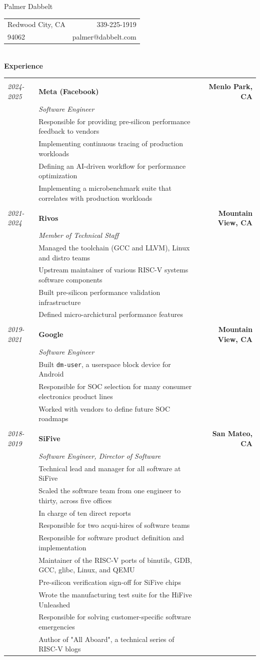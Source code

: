 \documentclass{letter}
\newcommand{\experience}[4]{&& \\
\textit{#1} \hspace{0.2in} & \textbf{#2} & \textbf{#3} \\
& \textit{#4} & \\}
\newcommand{\subexperience}[1]{& #1 & \\}
\begin{document}
\thispagestyle{empty}

\LARGE
\begin{center}Palmer Dabbelt\end{center}
\normalsize

\begin{tabular*}{\textwidth}{@{\extracolsep{\fill}} l r}
  Redwood City, CA& 339-225-1919 \\
  94062 & palmer@dabbelt.com \\
  \hline
\end{tabular*}\\

\textbf{Experience}\\
\begin{tabular*}{\textwidth}{l l @{\extracolsep{\fill}} r}
  \experience{2024-2025}{Meta (Facebook)}{Menlo Park, CA}{Software Engineer}
  \subexperience{Responsible for providing pre-silicon performance feedback to vendors}
  \subexperience{Implementing continuous tracing of production workloads}
  \subexperience{Defining an AI-driven workflow for performance optimization}
  \subexperience{Implementing a microbenchmark suite that correlates with production workloads}

  \experience{2021-2024}{Rivos}{Mountain View, CA}{Member of Technical Staff}
  \subexperience{Managed the toolchain (GCC and LLVM), Linux and distro teams}
  \subexperience{Upstream maintainer of various RISC-V systems software components}
  \subexperience{Built pre-silicon performance validation infrastructure}
  \subexperience{Defined micro-archictural performance features}

  \experience{2019-2021}{Google}{Mountain View, CA}{Software Engineer}
  \subexperience{Built \texttt{dm-user}, a userspace block device for Android}
  \subexperience{Responsible for SOC selection for many consumer electronics product lines}
  \subexperience{Worked with vendors to define future SOC roadmaps}

  \experience{2018-2019}{SiFive}{San Mateo, CA}{Software Engineer, Director of Software}
  \subexperience{Technical lead and manager for all software at SiFive}
  \subexperience{Scaled the software team from one engineer to thirty, across five offices}
  \subexperience{In charge of ten direct reports}
  \subexperience{Responsible for two acqui-hires of software teams}
  \subexperience{Responsible for software product definition and implementation}
  \subexperience{Maintainer of the RISC-V ports of binutils, GDB, GCC, glibc, Linux, and QEMU}
  \subexperience{Pre-silicon verification sign-off for SiFive chips}
  \subexperience{Wrote the manufacturing test suite for the HiFive Unleashed}
  \subexperience{Responsible for solving customer-specific software emergencies}
  \subexperience{Author of "All Aboard", a technical series of RISC-V blogs}


\end{tabular*}
\end{document}
